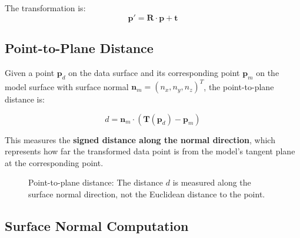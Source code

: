 \documentclass[11pt,a4paper]{article}
\begin{document}
The transformation is:
\begin{equation}
\mathbf{p}' = \mathbf{R} \cdot \mathbf{p} + \mathbf{t}
\end{equation}

\subsection{Point-to-Plane Distance}

Given a point $\mathbf{p}_d$ on the data surface and its corresponding point $\mathbf{p}_m$ on the model surface with surface normal $\mathbf{n}_m = (n_x, n_y, n_z)^T$, the point-to-plane distance is:

\begin{equation}
d = \mathbf{n}_m \cdot (\mathbf{T}(\mathbf{p}_d) - \mathbf{p}_m)
\end{equation}

This measures the \textbf{signed distance along the normal direction}, which represents how far the transformed data point is from the model's tangent plane at the corresponding point.

\begin{figure}[h]
\centering
{}
\caption{Point-to-plane distance: The distance $d$ is measured along the surface normal direction, not the Euclidean distance to the point.}
\end{figure}

\subsection{Surface Normal Computation}
\end{document}
